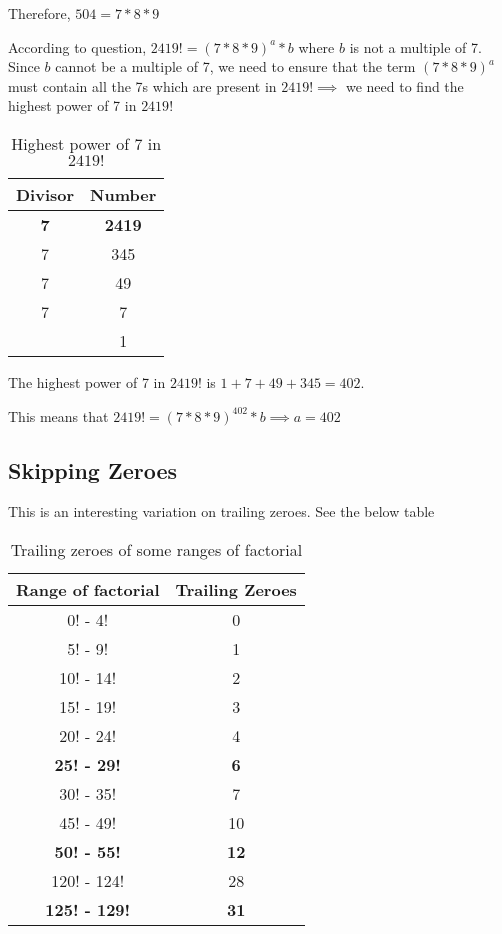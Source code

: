Therefore, $504 = 7 * 8 * 9$

According to question, $2419! = (7 * 8 * 9 ) ^a * b$ where $b$ is not a multiple of 7. Since $b$ cannot be a multiple of 7, we need to ensure that the term $(7*8*9)^a$ must contain all the 7s which are present in $2419! \implies$ we need to find the highest power of 7 in $2419!$

\begin{table}[ht!]
    \centering
    \begin{tabular}{|| c | c ||}
         \hline
         Divisor & Number  \\
        \hline 
         \textbf{7} & \textbf{2419} \\
         7 & 345 \\ 
         7 & 49 \\
         7 & 7 \\
           & 1 \\
        \hline
    \end{tabular}
    \caption{Highest power of 7 in $2419!$}
\end{table}

The highest power of 7 in $2419!$ is $1 + 7 + 49 + 345 = 402$.

This means that $2419! = (7 * 8 * 9)^{402} * b \implies a = 402$


\subsection{Skipping Zeroes}

This is an interesting variation on trailing zeroes. See the below table 

\begin{table}[ht!]
    \centering
    \begin{tabular}{|| c | c ||}
        \hline
         \textbf{Range of factorial} & \textbf{Trailing Zeroes}  \\
        \hline
         0! - 4! & 0 \\
         5! - 9! & 1 \\
         10! - 14! & 2 \\
         15! - 19! & 3 \\
         20! - 24! & 4 \\
         \textbf{25! - 29!} & \textbf{6} \\
         30! - 35! & 7 \\
         45! - 49! & 10 \\
         \textbf{50! - 55!} & \textbf{12} \\
         120! - 124! & 28 \\
         \textbf{125! - 129!} & \textbf{31} \\
        \hline
    \end{tabular}
    \caption{Trailing zeroes of some ranges of factorial}
    \label{tab:trailing_zero_seq}
\end{table}


